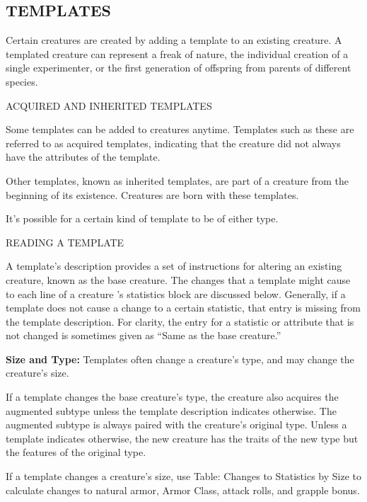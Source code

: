 \documentclass{article}
\begin{document}
\vspace{12pt}
\subsection*{{\LARGE{}TEMPLATES}}

Certain creatures are created by adding a template to an existing creature. A templated 
creature can represent a freak of nature, the individual creation of a single experimenter, 
or the first generation of offspring from parents of different species.

\vspace{12pt}
ACQUIRED AND INHERITED TEMPLATES

Some templates can be added to creatures anytime. Templates such as these are referred 
to as acquired templates, indicating that the creature did not always have the 
attributes of the template.

Other templates, known as inherited templates, are part of a creature from the 
beginning of its existence. Creatures are born with these templates.

It's possible for a certain kind of template to be of either type. 

\vspace{12pt}
READING A TEMPLATE

A template's description provides a set of instructions for altering an existing 
creature, known as the base creature. The changes that a template might cause to 
each line of a creature 's statistics block are discussed below. Generally, if 
a template does not cause a change to a certain statistic, that entry is missing 
from the template description. For clarity, the entry for a statistic or attribute 
that is not changed is sometimes given as ``Same as the base creature.'' 

\textbf{Size and Type:} Templates often change a creature's type, and may change 
the creature's size.

If a template changes the base creature's type, the creature also acquires the 
augmented subtype unless the template description indicates otherwise. The augmented 
subtype is always paired with the creature's original type. Unless a template indicates 
otherwise, the new creature has the traits of the new type but the features of 
the original type.

If a template changes a creature's size, use Table: Changes to Statistics by Size 
to calculate changes to natural armor, Armor Class, attack rolls, and grapple bonus.
\end{document}
